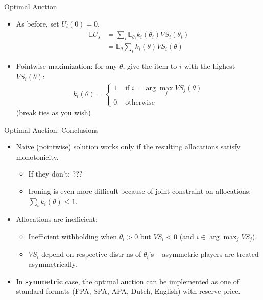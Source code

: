 \documentclass[english,10pt
,aspectratio=169
]{beamer}
\begin{document}
\begin{frame}{Optimal Auction}
\begin{itemize}
	\item As before, set $\bar{U}_i(0) = 0$.
	{\footnotesize
		\begin{align*}
			\mathbb{E} U_s &= \sum_i \mathbb{E}_{\theta_i} \bar{k}_i(\theta_i) VS_i(\theta_i)
			\\
			&= \mathbb{E}_{\theta} \sum_i k_i(\theta) VS_i(\theta)
		\end{align*}
	}
	\item Pointwise maximization: for any $\theta$, give the item to $i$ with the highest $VS_i(\theta)$:
	\begin{align*}
		k_i(\theta) = 
		\begin{cases}
			1 & \text{ if } i = \arg \max_j VS_j(\theta)
			\\
			0 & \text { otherwise}
		\end{cases}
	\end{align*}
	(break ties as you wish)
\end{itemize}
\end{frame}


\begin{frame}{Optimal Auction: Conclusions}
\begin{itemize}
	\item Naive (pointwise) solution works only if the resulting allocations satisfy monotonicity.
	\begin{itemize}
		\item If they don't: ???
		\item Ironing is even more difficult because of joint constraint on allocations: $\sum_i k_i (\theta) \leq 1$.
	\end{itemize}
	\item Allocations are inefficient:
	\begin{itemize}
		\item Inefficient withholding when $\theta_i > 0$ but $VS_i < 0$ (and $i \in \arg \max_j VS_j$).
		\item $VS_i$ depend on respective distr-ns of $\theta_i$'s -- asymmetric players are treated asymmetrically.
	\end{itemize}
	\item In \textbf{symmetric} case, the optimal auction can be implemented as one of standard formats (FPA, SPA, APA, Dutch, English) with reserve price.
\end{itemize}
\end{frame}
\end{document}
